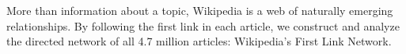 More than information about a topic, Wikipedia is a web of naturally emerging relationships. By following the first link in each article, we construct and analyze the directed network of all 4.7 million articles: Wikipedia’s First Link Network.
